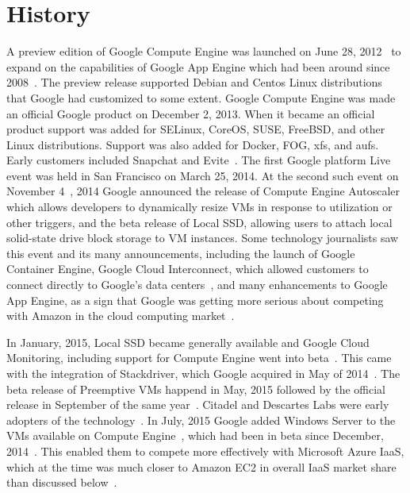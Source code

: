 \section{History}
A preview edition of Google Compute Engine was launched on June 28,
2012~\cite{hid-sp18-419-googleblog20120628} to expand on the
capabilities of Google App Engine which had been around since
2008~\cite{hid-sp18-419-gcp-history-medium}. The preview release
supported Debian and Centos Linux distributions that Google had
customized to some extent. Google Compute Engine was made an official
Google product on December 2, 2013. When it became an official product
support was added for SELinux, CoreOS, SUSE, FreeBSD, and other Linux
distributions. Support was also added for Docker, FOG, xfs, and
aufs. Early customers included Snapchat and
Evite~\cite{hid-sp18-419-googleblog20131202}. The first Google
platform Live event was held in San Francisco on March 25, 2014. At
the second such event on November
4~\cite{hid-sp18-419-googleblog20140812}, 2014 Google announced the
release of Compute Engine Autoscaler which allows developers to
dynamically resize VMs in response to utilization or other triggers,
and the beta release of Local SSD, allowing users to attach local
solid-state drive block storage to VM instances. Some technology
journalists saw this event and its many announcements, including the
launch of Google Container Engine, Google Cloud Interconnect, which
allowed customers to connect directly to Google's data
centers~\cite{hid-sp18-419-gcp-techcrunch-20141104}, and many
enhancements to Google App Engine, as a sign that Google was getting
more serious about competing with Amazon in the cloud computing
market~\cite{hid-sp18-419-forbes-gcp-20141104}.

In January, 2015, Local SSD became generally available and Google
Cloud Monitoring, including support for Compute Engine went into
beta~\cite{hid-sp18-419-googleblog20150113}. This came with the
integration of Stackdriver, which Google acquired in May of
2014~\cite{hid-sp18-419-googleblog20140507}. The beta release of
Preemptive VMs happend in May, 2015 followed by the official release
in September of the same
year~\cite{hid-sp18-419-venturebeat-preemptive-vms}. Citadel and
Descartes Labs were early adopters of the
technology~\cite{hid-sp18-419-googleblog20150518}. In July, 2015
Google added Windows Server to the VMs available on Compute
Engine~\cite{hid-sp18-419-googleblog20150715}, which had been in beta
since December, 2014~\cite{hid-sp18-419-googleblog20141208}. This
enabled them to compete more effectively with Microsoft Azure IaaS,
which at the time was much closer to Amazon EC2 in overall IaaS market
share than discussed
below~\cite{hid-sp18-419-statista-iaas-market2015}.


